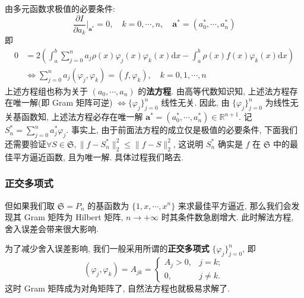 \documentclass[UTF8, a4paper, 11pt]{ctexart}
\begin{document}
由多元函数求极值的必要条件:
\[ \frac{\partial I}{\partial a_k} \bigg|_{\bm{a}^*} = 0, \quad k = 0, \cdots, n, \quad \bm{a}^* = (a_0^*, \cdots, a_n^*) \]
即
\begin{align}
    0 &= 2 \left( \int_a^b \sum_{j=0}^n a_j \rho(x) \varphi_j(x) \varphi_k(x) \mathrm{d} x - \int_a^b \rho(x) f(x) \varphi_k(x) \mathrm{d} x \right)\\
    &\iff \sum_{j=0}^n a_j (\varphi_j, \varphi_k) = (f, \varphi_k), \quad k = 0, 1, \cdots, n
\end{align}
上述方程组也称为关于 $ (a_0, \cdots, a_n) $ 的\textbf{法方程}. 由高等代数知识知, 上述法方程存在唯一解(即 Gram 矩阵可逆) $ \Longleftrightarrow \{ \varphi_j \}_{j=0}^n $ 线性无关. 因此, 由 $ \{ \varphi_j \}_{j=0}^n $ 为线性无关基函数知, 上述法方程必存在唯一解 $ \bm{a}^* = (a_0^*, \cdots, a_n^*) \in \mathbb{R}^{n+1} $. 记 $ S_n^* = \sum_{j=0}^n a_j^* \varphi_j $. 事实上, 由于前面法方程的成立仅是极值的必要条件, 下面我们还需要验证$ \forall S \in \mathfrak{S}, \| f - S_n^* \|_2^2 \leq \| f - S \|_2^2 $, 这说明 $ S_n^* $ 确实是 $ f $ 在 $ \mathfrak{S} $ 中的最佳平方逼近函数, 且为唯一解. 具体过程我们略去. 

\subsubsection{正交多项式}
但如果我们取 $ \mathfrak{S} = P_n $ 的基函数为 $ \{1, x, \cdots, x^n\} $ 来求最佳平方逼近, 那么我们会发现其 Gram 矩阵为 Hilbert 矩阵, $ n \rightarrow +\infty $ 时其条件数急剧增大. 此时解法方程, 舍入误差会带来很大影响.

为了减少舍入误差影响, 我们一般采用所谓的\textbf{正交多项式} $ \{\varphi_j\}_{j=0}^n $, 即
\[ (\varphi_j, \varphi_k) = A_{jk} = \left\{
\begin{array}{ll}
A_j > 0, & j = k; \\
0, & j \neq k.
\end{array}
\right. \]
这时 Gram 矩阵成为对角矩阵了, 自然法方程也就极易求解了.
\end{document}
